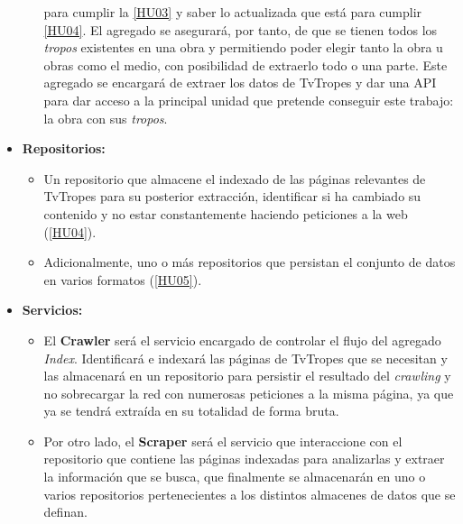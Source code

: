 \begin{itemize}
\begin{itemize}
    para cumplir la
    \href{https://github.com/jlgallego99/TropesToGo/issues/8}{[HU03]} y saber lo
    actualizada que está para cumplir
    \href{https://github.com/jlgallego99/TropesToGo/issues/9}{[HU04]}. El
    agregado se asegurará, por tanto, de que se tienen todos los \textit{tropos}
    existentes en una obra y permitiendo poder elegir tanto la obra u obras como
    el medio, con posibilidad de extraerlo todo o una parte. Este agregado se
    encargará de extraer los datos de TvTropes y dar una API para dar acceso a
    la principal unidad que pretende conseguir este trabajo: la obra con sus
    \textit{tropos}.
  \end{itemize}
  \item \textbf{Repositorios:}
  \begin{itemize}
    \item Un repositorio que almacene el indexado de las páginas relevantes de
    TvTropes para su posterior extracción, identificar si ha cambiado su
    contenido y no estar constantemente haciendo peticiones a la web
    (\href{https://github.com/jlgallego99/TropesToGo/issues/9}{[HU04]}).
    \item Adicionalmente, uno o más repositorios que persistan el conjunto de
    datos en varios formatos
    (\href{https://github.com/jlgallego99/TropesToGo/issues/30}{[HU05]}).
  \end{itemize}
  \item \textbf{Servicios:}
  \begin{itemize}
    \item El
    \textbf{Crawler}
    será el servicio encargado de controlar el flujo del agregado
    \textit{Index}. Identificará e indexará las páginas de TvTropes que se
    necesitan y las almacenará en un repositorio para persistir el resultado del
    \textit{crawling} y no sobrecargar la red con numerosas peticiones a la
    misma página, ya que ya se tendrá extraída en su totalidad de forma bruta.
    \item Por otro lado, el
    \textbf{Scraper}
    será el servicio que interaccione con el repositorio que contiene las
    páginas indexadas para analizarlas y extraer la información que se busca,
    que finalmente se almacenarán en uno o varios repositorios pertenecientes a
    los distintos almacenes de datos que se definan. 
  \end{itemize}
\end{itemize}

